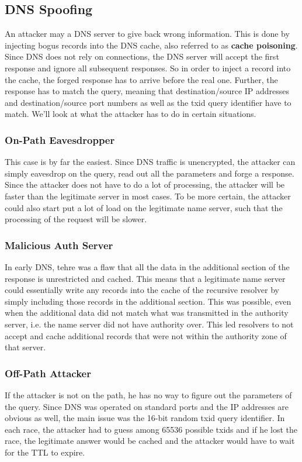 \subsection{DNS Spoofing}
An attacker may a DNS server to give back wrong information. This is done by injecting bogus records into the DNS cache, also referred to as \textbf{cache poisoning}. Since DNS does not rely on connections, the DNS server will accept the first response and ignore all subsequent responses. So in order to inject a record into the cache, the forged response has to arrive before the real one. Further, the response has to match the query, meaning that destination/source IP addresses and destination/source port numbers as well as the txid query identifier have to match. We'll look at what the attacker has to do in certain situations.

\subsubsection{On-Path Eavesdropper}
This case is by far the easiest. Since DNS traffic is unencrypted, the attacker can simply eavesdrop on the query, read out all the parameters and forge a response. Since the attacker does not have to do a lot of processing, the attacker will be faster than the legitimate server in most cases. To be more certain, the attacker could also start put a lot of load on the legitimate name server, such that the processing of the request will be slower.

\subsubsection{Malicious Auth Server}
In early DNS, tehre was a flaw that all the data in the additional section of the response is unrestricted and cached. This means that a legitimate name server could essentially write any records into the cache of the recursive resolver by simply including those records in the additional section. This was possible, even when the additional data did not match what was transmitted in the authority server, i.e. the name server did not have authority over. This led resolvers to not accept and cache additional records that were not within the authority zone of that server.

\subsubsection{Off-Path Attacker}
If the attacker is not on the path, he has no way to figure out the parameters of the query. Since DNS was operated on standard ports and the IP addresses are obvious as well, the main issue was the 16-bit random txid query identifier. In each race, the attacker had to guess among 65536 possible txids and if he lost the race, the legitimate answer would be cached and the attacker would have to wait for the TTL to expire.\vspace{.3cm}\\

